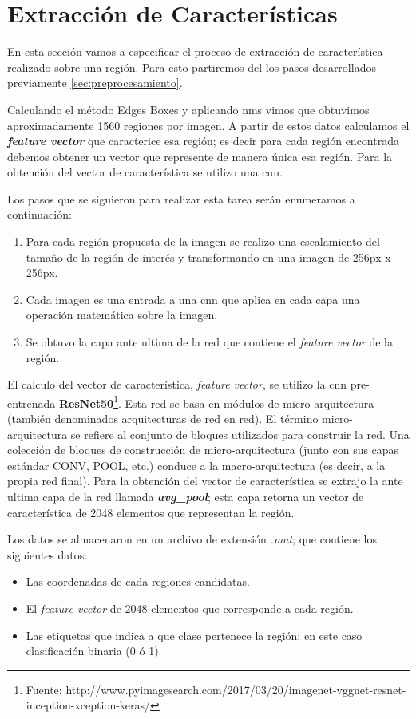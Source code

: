 \section{Extracción de Características}\label{sec:extracciondecaracteristica}

En esta sección vamos a especificar el proceso de extracción  de característica realizado sobre una región. Para esto partiremos del los pasos desarrollados previamente \ref{sec:preprocesamiento}.

Calculando el método Edges Boxes y aplicando \ac{nms} vimos que obtuvimos aproximadamente 1560 regiones por imagen. A partir de estos datos calculamos el \textbf{\textit{feature vector}} que caracterice esa región; es decir para cada región encontrada debemos obtener un vector que represente de manera única esa región. Para la obtención del vector de característica se utilizo una \ac{cnn}. 

Los pasos que se siguieron para realizar esta tarea serán enumeramos a continuación:

\begin{enumerate}
	\item Para cada región propuesta de la imagen se realizo una escalamiento del tamaño de la región de interés y  transformando en una imagen de 256px x 256px.
	\item Cada imagen es una entrada a una \ac{cnn} que aplica en cada capa una operación matemática sobre la imagen.
	\item Se obtuvo la capa ante ultima de la red que contiene el \textit{feature vector} de la región. 
\end{enumerate}

El calculo del vector de característica, \textit{feature vector}, se utilizo la \ac{cnn} pre-entrenada \textbf{ResNet50}\footnote{Fuente: http://www.pyimagesearch.com/2017/03/20/imagenet-vggnet-resnet-inception-xception-keras/}. Esta red se basa en módulos de micro-arquitectura (también denominados arquitecturas de red en red). El término micro-arquitectura se refiere al conjunto de bloques utilizados para construir la red. Una colección de bloques de construcción de micro-arquitectura (junto con sus capas estándar CONV, POOL, etc.) conduce a la macro-arquitectura (es decir, a la propia red final). Para la obtención del vector de característica se extrajo la ante ultima capa de la red llamada \textit{\textbf{avg\_pool}}; esta capa retorna un vector de característica de 2048 elementos que representan la región.


Los datos se almacenaron en un archivo de extensión \textit{.mat}; que contiene los siguientes datos:
\begin{itemize}
 \item Las coordenadas de cada regiones candidatas.
 \item El \textit{feature vector} de 2048 elementos que corresponde a cada región. 
 \item Las etiquetas que indica a que clase pertenece la región; en este caso clasificación binaria (0 ó 1).
\end{itemize}






